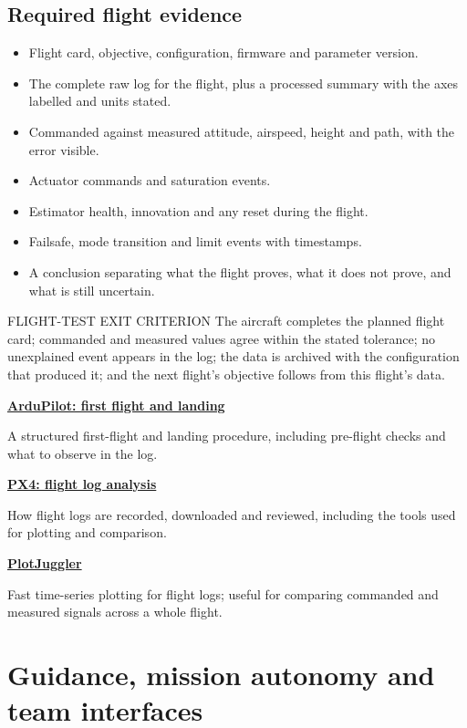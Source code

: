 \documentclass[11pt,a4paper]{article}
\newcommand{\Resource}[3]{%
  \begin{resourcebox}
    \href{#2}{\textbf{\color{DARESTeal}#1}}\par
    {\small #3}
  \end{resourcebox}
}
\begin{document}
\subsection{Required flight evidence}

\begin{itemize}
  \item Flight card, objective, configuration, firmware and parameter version.
  \item The complete raw log for the flight, plus a processed summary with the axes labelled and units stated.
  \item Commanded against measured attitude, airspeed, height and path, with the error visible.
  \item Actuator commands and saturation events.
  \item Estimator health, innovation and any reset during the flight.
  \item Failsafe, mode transition and limit events with timestamps.
  \item A conclusion separating what the flight proves, what it does not prove, and what is still uncertain.
\end{itemize}

\begin{callout}{FLIGHT-TEST EXIT CRITERION}
  The aircraft completes the planned flight card; commanded and measured values
  agree within the stated tolerance; no unexplained event appears in the log;
  the data is archived with the configuration that produced it; and the next
  flight's objective follows from this flight's data.
\end{callout}

\Resource
  {ArduPilot: first flight and landing}
  {https://ardupilot.org/plane/docs/first-flight-landing-page.html}
  {A structured first-flight and landing procedure, including pre-flight checks and what to observe in the log.}

\Resource
  {PX4: flight log analysis}
  {https://docs.px4.io/main/en/log/flight_log_analysis.html}
  {How flight logs are recorded, downloaded and reviewed, including the tools used for plotting and comparison.}

\Resource
  {PlotJuggler}
  {https://plotjuggler.io/}
  {Fast time-series plotting for flight logs; useful for comparing commanded and measured signals across a whole flight.}

\section{Guidance, mission autonomy and team interfaces}
\end{document}
